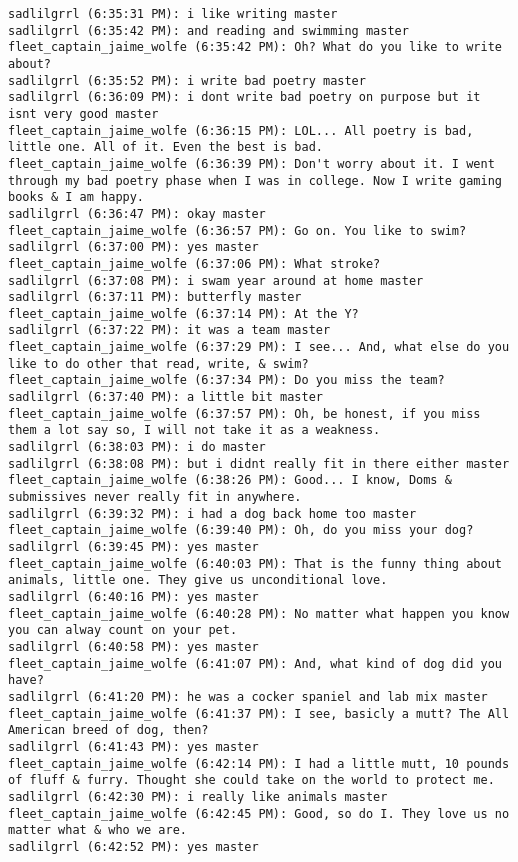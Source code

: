 \begin{verbatim}
sadlilgrrl (6:35:31 PM): i like writing master
sadlilgrrl (6:35:42 PM): and reading and swimming master
fleet_captain_jaime_wolfe (6:35:42 PM): Oh? What do you like to write about?
sadlilgrrl (6:35:52 PM): i write bad poetry master
sadlilgrrl (6:36:09 PM): i dont write bad poetry on purpose but it isnt very good master
fleet_captain_jaime_wolfe (6:36:15 PM): LOL... All poetry is bad, little one. All of it. Even the best is bad.
fleet_captain_jaime_wolfe (6:36:39 PM): Don't worry about it. I went through my bad poetry phase when I was in college. Now I write gaming books & I am happy.
sadlilgrrl (6:36:47 PM): okay master
fleet_captain_jaime_wolfe (6:36:57 PM): Go on. You like to swim?
sadlilgrrl (6:37:00 PM): yes master
fleet_captain_jaime_wolfe (6:37:06 PM): What stroke?
sadlilgrrl (6:37:08 PM): i swam year around at home master
sadlilgrrl (6:37:11 PM): butterfly master
fleet_captain_jaime_wolfe (6:37:14 PM): At the Y?
sadlilgrrl (6:37:22 PM): it was a team master 
fleet_captain_jaime_wolfe (6:37:29 PM): I see... And, what else do you like to do other that read, write, & swim?
fleet_captain_jaime_wolfe (6:37:34 PM): Do you miss the team?
sadlilgrrl (6:37:40 PM): a little bit master
fleet_captain_jaime_wolfe (6:37:57 PM): Oh, be honest, if you miss them a lot say so, I will not take it as a weakness.
sadlilgrrl (6:38:03 PM): i do master
sadlilgrrl (6:38:08 PM): but i didnt really fit in there either master
fleet_captain_jaime_wolfe (6:38:26 PM): Good... I know, Doms & submissives never really fit in anywhere.
sadlilgrrl (6:39:32 PM): i had a dog back home too master
fleet_captain_jaime_wolfe (6:39:40 PM): Oh, do you miss your dog?
sadlilgrrl (6:39:45 PM): yes master
fleet_captain_jaime_wolfe (6:40:03 PM): That is the funny thing about animals, little one. They give us unconditional love.
sadlilgrrl (6:40:16 PM): yes master
fleet_captain_jaime_wolfe (6:40:28 PM): No matter what happen you know you can alway count on your pet.
sadlilgrrl (6:40:58 PM): yes master
fleet_captain_jaime_wolfe (6:41:07 PM): And, what kind of dog did you have?
sadlilgrrl (6:41:20 PM): he was a cocker spaniel and lab mix master
fleet_captain_jaime_wolfe (6:41:37 PM): I see, basicly a mutt? The All American breed of dog, then?
sadlilgrrl (6:41:43 PM): yes master
fleet_captain_jaime_wolfe (6:42:14 PM): I had a little mutt, 10 pounds of fluff & furry. Thought she could take on the world to protect me.
sadlilgrrl (6:42:30 PM): i really like animals master
fleet_captain_jaime_wolfe (6:42:45 PM): Good, so do I. They love us no matter what & who we are.
sadlilgrrl (6:42:52 PM): yes master

\end{verbatim}
